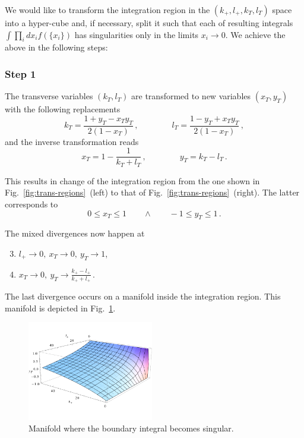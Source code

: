 \documentclass[a4paper,11pt]{report}
\numberwithin{equation}{section}
\newcommand{\kp}{k_+}
\newcommand{\lp}{l_+}
\begin{document}
We would like to transform the integration region in the $(\kp, \lp, k_T, l_T)$
space into a hyper-cube and, if necessary, split it such that each of resulting
integrals $\int \prod_i d x_i f(\{x_i\})$ has singularities only in the limits
$x_i \to 0$.
%
We achieve the above in the following steps:
 
\subsubsection*{Step 1}

The transverse variables $(k_T, l_T)$ are transformed to new variables 
$(x_T, y_T)$ with the following replacements
%
\begin{equation}
  k_T = \frac{1+y_T-x_T y_T}{2(1-x_T)}\,,
  \qquad \qquad
  l_T = \frac{1-y_T+x_T y_T}{2(1-x_T)}\,,
\end{equation}
%
and the inverse transformation reads
\begin{equation}
  x_T = 1-\frac{1}{k_T+l_T}\,,
  \qquad \qquad
  y_T = k_T-l_T\,.
\end{equation}

This results in change of the integration region from the one shown in
Fig.~\ref{fig:trans-regions}~(left) to that of
Fig.~\ref{fig:trans-regions}~(right). The latter corresponds to
%
\begin{equation}
  0 \leq x_T \leq 1
  \qquad \land \qquad
  -1 \leq y_T \leq 1\,.
\end{equation}

The mixed divergences  now happen at
%
\begin{enumerate}
  \setcounter{enumi}{2}
  \item
    $l_+ \to 0,\ x_T \to 0,\ y_T \to 1$,
  \item
    $x_T \to 0,\ y_T \to \displaystyle \frac{\kp-\lp}{\kp+\lp}$\,.
\end{enumerate}
%
The last divergence occurs on a manifold inside the integration region. This
manifold is depicted in Fig.~\ref{fig:yTmanifold}.

\begin{figure}[t]
  \begin{center}
    \includegraphics[width=0.49\textwidth]{plots/yTmanifold.pdf}
  \end{center}
  \caption{
  Manifold where the boundary integral becomes singular.
  }
  \label{fig:yTmanifold}
\end{figure}
\end{document}
